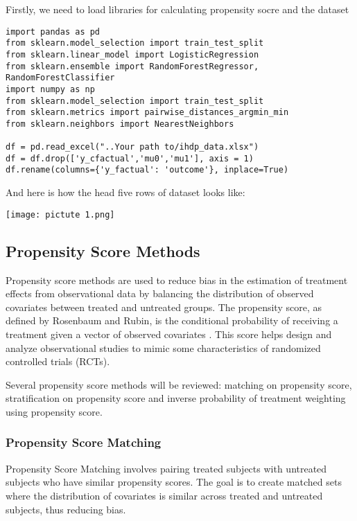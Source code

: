 \documentclass{article}
\begin{document}
\noindent Firstly, we need to load libraries for calculating propensity socre and the dataset
\begin{verbatim}
import pandas as pd
from sklearn.model_selection import train_test_split
from sklearn.linear_model import LogisticRegression
from sklearn.ensemble import RandomForestRegressor, RandomForestClassifier
import numpy as np
from sklearn.model_selection import train_test_split
from sklearn.metrics import pairwise_distances_argmin_min
from sklearn.neighbors import NearestNeighbors

df = pd.read_excel("..Your path to/ihdp_data.xlsx")
df = df.drop(['y_cfactual','mu0','mu1'], axis = 1)
df.rename(columns={'y_factual': 'outcome'}, inplace=True)
\end{verbatim}

\noindent And here is how the head five rows of dataset looks like:

\begin{center}
\texttt{[image: pictute 1.png]}
\end{center}

\subsection{Propensity Score Methods}
Propensity score methods are used to reduce bias in the estimation of treatment effects from observational data by balancing the distribution of observed covariates between treated and untreated groups. The propensity score, as defined by Rosenbaum and Rubin, is the conditional probability of receiving a treatment given a vector of observed covariates \cite{02661ce5-af38-340f-8868-4707520df52a}. This score helps design and analyze observational studies to mimic some characteristics of randomized controlled trials (RCTs).

Several propensity score methods will be reviewed: matching on propensity score, stratification on propensity score and inverse probability of treatment weighting using  propensity score.

\subsubsection{Propensity Score Matching}
Propensity Score Matching involves pairing treated subjects with untreated subjects who have similar propensity scores. The goal is to create matched sets where the distribution of covariates is similar across treated and untreated subjects, thus reducing bias. 
\end{document}
